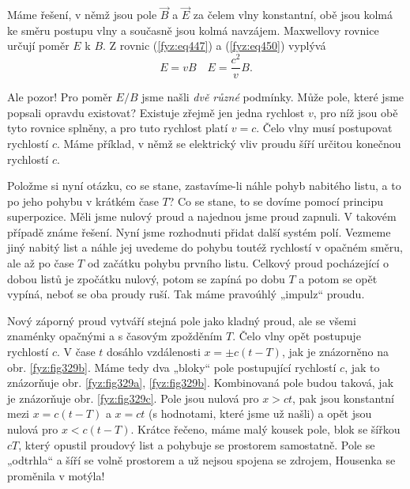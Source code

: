   Máme řešení, v němž jsou pole \(\vec{B}\) a \(\vec{E}\) za čelem vlny konstantní, obě jsou kolmá 
  ke směru postupu vlny a současně jsou kolmá navzájem. Maxwellovy rovnice určují poměr \(E\) k 
  \(B\). Z rovnic (\ref{fyz:eq447}) a (\ref{fyz:eq450}) vyplývá
  \begin{equation*}
    E = vB \quad E = \frac{c^2}{v}B.
  \end{equation*}
  
  Ale pozor! Pro poměr \(E/B\) jsme našli \emph{dvě různé} podmínky. Může pole, které jsme popsali 
  opravdu existovat? Existuje zřejmě jen jedna rychlost \(v\), pro níž jsou obě tyto rovnice 
  splněny, a pro tuto rychlost platí \(v = c\). Čelo vlny musí postupovat rychlostí \(c\). Máme 
  příklad, v němž se elektrický vliv proudu šíří určitou konečnou rychlostí \(c\). 
  
  Položme si nyní otázku, co se stane, zastavíme-li náhle pohyb nabitého listu, a to po jeho pohybu 
  v krátkém čase \(T\)? Co se stane, to se dovíme pomocí principu superpozice. Měli jsme nulový 
  proud a najednou jsme proud zapnuli. V takovém případě známe řešení. Nyní jsme rozhodnuti přidat 
  další systém polí. Vezmeme jiný nabitý list a náhle jej uvedeme do pohybu toutéž rychlostí v 
  opačném směru, ale až po čase \(T\) od začátku pohybu prvního listu. Celkový proud pocházející o 
  dobou listů je zpočátku nulový, potom se zapíná po dobu \(T\) a potom se opět vypíná, neboť se 
  oba proudy ruší. Tak máme pravoúhlý „impulz“ proudu. 
  
  Nový záporný proud vytváří stejná pole jako kladný proud, ale se všemi znaménky opačnými a s 
  časovým zpožděním \(T\). Čelo vlny opět postupuje rychlostí \(c\). V čase \(t\) dosáhlo 
  vzdálenosti \(x=\pm c(t-T)\), jak je znázorněno na obr. \ref{fyz:fig329b}. Máme tedy dva „bloky“ 
  pole postupující rychlostí \(c\), jak to znázorňuje obr. \ref{fyz:fig329a}, \ref{fyz:fig329b}. 
  Kombinovaná pole budou taková, jak je znázorňuje obr. \ref{fyz:fig329c}. Pole jsou nulová pro 
  \(x>ct\), pak jsou konstantní mezi \(x = c(t - T)\) a \(x = ct\) (s hodnotami, které jsme už 
  našli) a opět jsou nulová pro \(x<c(t-T)\). Krátce řečeno, máme malý kousek pole, blok se šířkou 
  \(cT\), který opustil proudový list a pohybuje se prostorem samostatně. Pole se „odtrhla“ a šíří 
  se volně prostorem a už nejsou spojena se zdrojem, Housenka se proměnila v motýla! 
  
